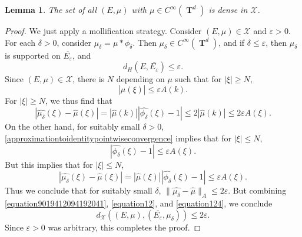 \documentclass[12pt,reqno]{article}
\DeclareMathOperator{\TT}{\mathbf{T}}
\newtheorem{lemma}[theorem]{Lemma}
\begin{document}
\begin{lemma}
    The set of all $(E,\mu)$ with $\mu \in C^\infty(\TT^d)$ is dense in $\mathcal{X}$.
\end{lemma}
\begin{proof}
    We just apply a mollification strategy. Consider $(E,\mu) \in \mathcal{X}$ and $\varepsilon > 0$. For each $\delta > 0$, consider $\mu_\delta = \mu * \phi_\delta$. Then $\mu_\delta \in C^\infty(\TT^d)$, and if $\delta \leq \varepsilon$, then $\mu_\delta$ is supported on $\overline{E_\varepsilon}$, and
    \begin{equation} \label{equation9019412094192041}
        d_H(E,\overline{E_\varepsilon}) \leq \varepsilon.
    \end{equation}
    Since $(E,\mu) \in \mathcal{X}$, there is $N$ depending on $\mu$ such that for $|\xi| \geq N$,
    \[ |\widehat{\mu}(\xi)| \leq \varepsilon A(k). \]
    For $|\xi| \geq N$, we thus find that
    \begin{equation} \label{equation12}
        |\widehat{\mu_\delta}(\xi) - \widehat{\mu}(\xi)| = |\widehat{\mu}(k)||\widehat{\phi_\delta}(\xi) - 1| \leq 2 |\widehat{\mu}(k)| \leq 2\varepsilon A(\xi).
    \end{equation}
    On the other hand, for suitably small $\delta > 0$, \eqref{approximationtoidentitypointwiseconvergence} implies that for $|\xi| \leq N$,
    \[ |\widehat{\phi_\delta}(\xi) - 1| \leq \varepsilon A(\xi). \]
    But this implies that for $|\xi| \leq N$,
    \begin{equation} \label{equation124}
        |\widehat{\mu_\delta}(\xi) - \widehat{\mu}(\xi)| = |\widehat{\mu}(\xi)| |\widehat{\phi_\delta}(\xi) - 1| \leq \varepsilon A(\xi).
    \end{equation}
    Thus we conclude that for suitably small $\delta$, $\| \widehat{\mu_\delta} - \widehat{\mu} \|_A \leq 2 \varepsilon$. But combining \eqref{equation9019412094192041}, \eqref{equation12}, and \eqref{equation124}, we conclude
    \[ d_{\mathcal{X}}((E,\mu), (\overline{E_\varepsilon}, \mu_\delta)) \leq 2 \varepsilon. \]
    Since $\varepsilon > 0$ was arbitrary, this completes the proof.
\end{proof}
\end{document}
